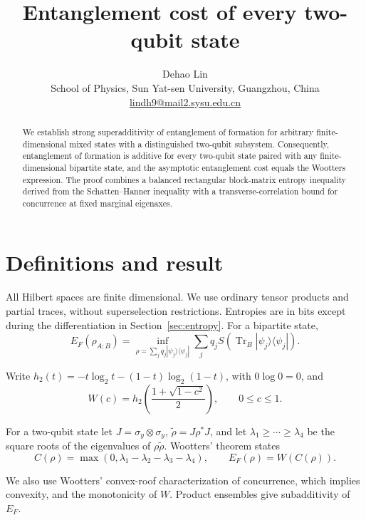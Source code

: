 \documentclass[10pt,letterpaper]{article}
\title{Entanglement cost of every two-qubit state}
\author{Dehao Lin\\[3pt]
  {\small School of Physics, Sun Yat-sen University, Guangzhou, China}\\[2pt]
  {\small\href{mailto:lindh9@mail2.sysu.edu.cn}{lindh9@mail2.sysu.edu.cn}}}
\date{}
\begin{document}
\maketitle
\begin{abstract}
We establish strong superadditivity of entanglement of formation for arbitrary
finite-dimensional mixed states with a distinguished two-qubit subsystem.
Consequently, entanglement of formation is additive for every two-qubit state
paired with any finite-dimensional bipartite state, and the asymptotic
entanglement cost equals the Wootters expression. The proof combines a balanced
rectangular block-matrix entropy inequality derived from the Schatten--Hanner
inequality with a transverse-correlation bound for concurrence at fixed
marginal eigenaxes.
\end{abstract}

\section{Definitions and result}

All Hilbert spaces are finite dimensional. We use ordinary tensor products and partial traces, without superselection restrictions. Entropies are in bits except during the differentiation in Section~\ref{sec:entropy}. For a bipartite state,
\begin{equation*}
E_F(\rho_{A:B})=\inf_{\rho=\sum_jq_j|\psi_j\rangle\langle\psi_j|}
\sum_jq_jS(\operatorname{Tr}_B|\psi_j\rangle\langle\psi_j|).
\end{equation*}

Write \(h_2(t)=-t\log_2t-(1-t)\log_2(1-t)\), with \(0\log0=0\), and
\begin{equation*}
W(c)=h_2\!\left(\frac{1+\sqrt{1-c^2}}2\right),\qquad 0\le c\le1.
\end{equation*}

For a two-qubit state let \(J=\sigma_y\otimes\sigma_y\), \(\widetilde\rho=J\rho^*J\), and let \(\lambda_1\ge\cdots\ge\lambda_4\) be the square roots of the eigenvalues of \(\rho\widetilde\rho\). Wootters' theorem \cite{ref1} states
\begin{equation*}
C(\rho)=\max(0,\lambda_1-\lambda_2-\lambda_3-\lambda_4),
\qquad E_F(\rho)=W(C(\rho)).
\end{equation*}

We also use Wootters' convex-roof characterization of concurrence, which implies convexity, and the monotonicity of \(W\). Product ensembles give subadditivity of \(E_F\).
\end{document}
